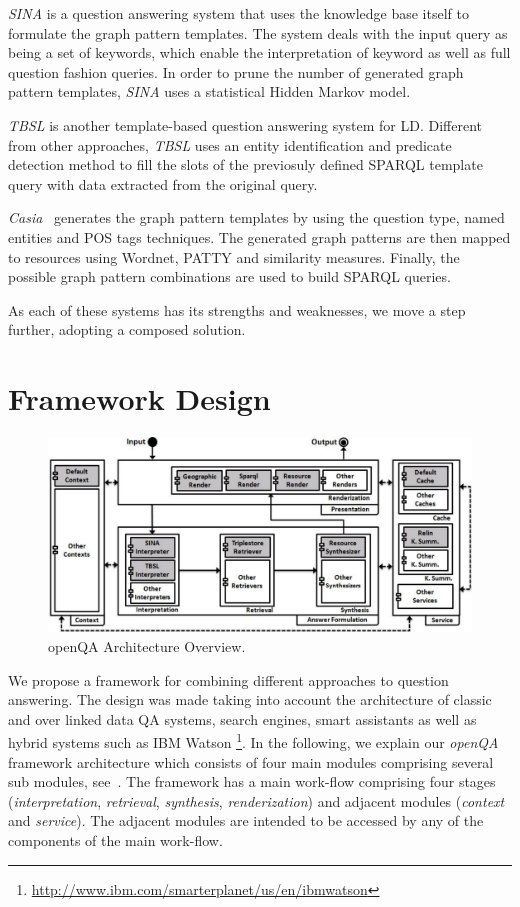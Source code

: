 \documentclass{acm_proc_article-sp}
\begin{document}
\emph{SINA} is a question answering system that uses the knowledge base itself to formulate the graph pattern templates.
The system deals with the input query as being a set of keywords, which enable the interpretation of keyword as well as full question fashion queries.
In order to prune the number of generated graph pattern templates, \emph{SINA} uses a statistical Hidden Markov model.

\emph{TBSL} is another template-based question answering system for LD.
Different from other approaches, \emph{TBSL} uses an entity identification and predicate detection method to fill the slots of the previosuly defined SPARQL template query with data extracted from the original query.

\emph{Casia}~\cite{clef2013casia} generates the graph pattern templates by using the question type, named entities and POS tags techniques.
The generated graph patterns are then mapped to resources using Wordnet, PATTY and similarity measures.
Finally, the possible graph pattern combinations are used to build SPARQL queries.

As each of these systems has its strengths and weaknesses, we move a step further, adopting a composed solution.

\section{Framework Design}
\label{sec:design}

\begin{figure}[bht]
	\centering
	\includegraphics[width=.97\textwidth]{images/architecture.pdf}
	\caption{openQA Architecture Overview.}
	\label{fig:architecture}
	\vspace{-4.0mm}
\end{figure}
We propose a framework for combining different approaches to question answering.
The design was made taking into account the architecture of classic and over linked data QA systems, search engines, smart assistants as well as hybrid systems such as IBM Watson \footnote{\url{http://www.ibm.com/smarterplanet/us/en/ibmwatson}}.
In the following, we explain our \emph{openQA} framework architecture which consists of four main modules comprising several sub modules, see~.
The framework has a main work-flow comprising four stages (\emph{interpretation}, \emph{retrieval}, \emph{synthesis},  %
\emph{renderization}) and adjacent modules (\emph{context} and \emph{service}).
The adjacent modules are intended to be accessed by any of the components of the main work-flow.
\end{document}
